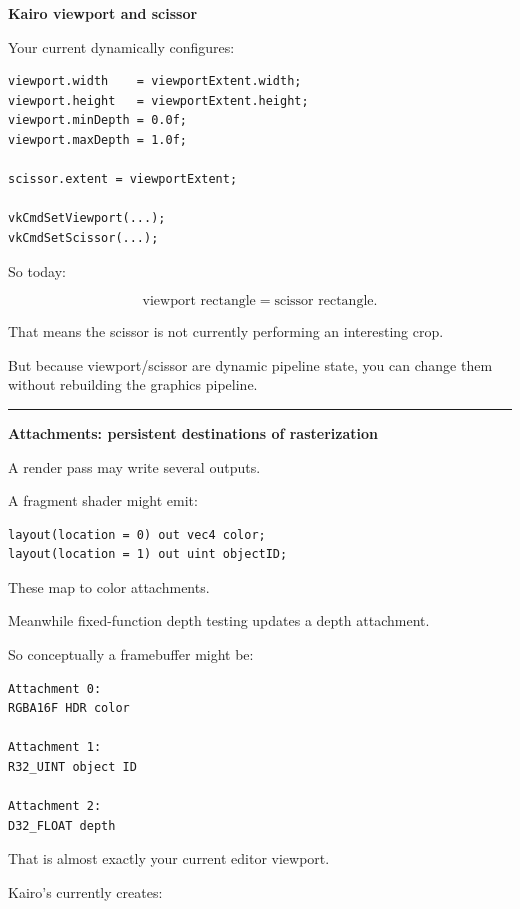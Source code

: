 \textbf{Kairo viewport and scissor}

Your current  dynamically configures:

\begin{verbatim}
viewport.width    = viewportExtent.width;
viewport.height   = viewportExtent.height;
viewport.minDepth = 0.0f;
viewport.maxDepth = 1.0f;

scissor.extent = viewportExtent;

vkCmdSetViewport(...);
vkCmdSetScissor(...);
\end{verbatim}

So today:

\[
\text{viewport rectangle}
=
\text{scissor rectangle}.
\]

That means the scissor is not currently performing an interesting crop.

But because viewport/scissor are dynamic pipeline state, you can change them without rebuilding the graphics pipeline.

\begin{center}\rule{0.5\linewidth}{0.5pt}\end{center}

\textbf{Attachments: persistent destinations of rasterization}

A render pass may write several outputs.

A fragment shader might emit:

\begin{verbatim}
layout(location = 0) out vec4 color;
layout(location = 1) out uint objectID;
\end{verbatim}

These map to color attachments.

Meanwhile fixed-function depth testing updates a depth attachment.

So conceptually a framebuffer might be:

\begin{verbatim}
Attachment 0:
RGBA16F HDR color

Attachment 1:
R32_UINT object ID

Attachment 2:
D32_FLOAT depth
\end{verbatim}

That is almost exactly your current editor viewport.

Kairo's  currently creates:

